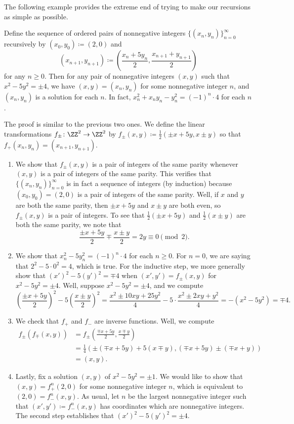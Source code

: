 \documentclass[../notes.tex]{subfiles}
\begin{document}
The following example provides the extreme end of trying to make our recursions as simple as possible.
\begin{example} \label{ex:pell-5}
	Define the sequence of ordered pairs of nonnegative integers $\{(x_n,y_n)\}_{n=0}^\infty$ recursively by $(x_0,y_0)\coloneqq(2,0)$ and
	\[(x_{n+1},y_{n+1})\coloneqq\left(\frac{x_n+5y_n}2,\frac{x_{n+1}+y_{n+1}}2\right)\]
	for any $n\ge0$. Then for any pair of nonnegative integers $(x,y)$ such that $x^2-5y^2=\pm4$, we have $(x,y)=(x_n,y_n)$ for some nonnegative integer $n$, and $(x_n,y_n)$ is a solution for each $n$. In fact, $x_n^2+x_ny_n-y_n^2=(-1)^n\cdot4$ for each $n$.
\end{example}
\begin{solution}
	The proof is similar to the previous two ones. We define the linear transformations $f_\pm\colon\ZZ^2\to\ZZ^2$ by $f_\pm(x,y)\coloneqq\frac12(\pm x+5y,x\pm y)$ so that $f_+(x_n,y_n)=(x_{n+1},y_{n+1})$.
	\begin{enumerate}
		\item We show that $f_\pm(x,y)$ is a pair of integers of the same parity whenever $(x,y)$ is a pair of integers of the same parity. This verifies that $\{(x_n,y_n)\}_{n=0}^\infty$ is in fact a sequence of integers (by induction) because $(x_0,y_0)=(2,0)$ is a pair of integers of the same parity. Well, if $x$ and $y$ are both the same parity, then $\pm x+5y$ and $x\pm y$ are both even, so $f_\pm(x,y)$ is a pair of integers. To see that $\frac12(\pm x+5y)$ and $\frac12(x\pm y)$ are both the same parity, we note that
		\[\frac{\pm x+5y}2\mp\frac{x\pm y}2=2y\equiv0\pmod2.\]
		\item We show that $x_n^2-5y_n^2=(-1)^n\cdot4$ for each $n\ge0$. For $n=0$, we are saying that $2^2-5\cdot0^2=4$, which is true. For the inductive step, we more generally show that $(x')^2-5(y')^2=\mp4$ when $(x',y')=f_\pm(x,y)$ for $x^2-5y^2=\pm4$. Well, suppose $x^2-5y^2=\pm4$, and we compute
		\[\left(\frac{\pm x+5y}2\right)^2-5\left(\frac{x\pm y}2\right)^2=\frac{x^2\pm10xy+25y^2}4-5\cdot\frac{x^2\pm2xy+y^2}4=-\left(x^2-5y^2\right)=\mp4.\]
		\item We check that $f_+$ and $f_-$ are inverse functions. Well, we compute
		\begin{align*}
			f_\pm(f_\mp(x,y)) &= f_\pm\left(\frac{\mp x+5y}2,\frac{x\mp y}2\right) \\
			&= \frac14(\pm(\mp x+5y)+5(x\mp y),(\mp x+5y)\pm(\mp x+y)) \\
			&= (x,y).
		\end{align*}
		\item Lastly, fix a solution $(x,y)$ of $x^2-5y^2=\pm1$. We would like to show that $(x,y)=f_+^n(2,0)$ for some nonnegative integer $n$, which is equivalent to $(2,0)=f_-^n(x,y)$. As usual, let $n$ be the largest nonnegative integer such that $(x',y')\coloneqq f_-^n(x,y)$ has coordinates which are nonnegative integers. The second step establishes that $(x')^2-5(y')^2=\pm4$.


\end{enumerate}
\end{solution}
\end{document}
